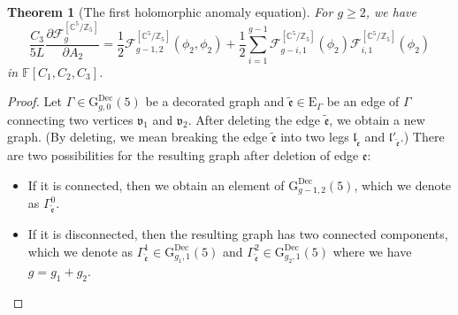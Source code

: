 \documentclass[10pt,a4paper]{amsart}
\newtheorem{thm}{Theorem}
\begin{document}
\begin{thm}[The first holomorphic anomaly equation]\label{thm:HAE_wrt_A2_partial}
For $g\geq{2}$, we have
\begin{equation*}
\frac{C_{3}}{5L}\frac{\partial\mathcal{F}_{g}^{\left[\mathbb{C}^{5} / \mathbb{Z}_{5}\right]}}{\partial A_2}
=\frac{1}{2}\mathcal{F}_{g-1,2}^{\left[\mathbb{C}^5 / \mathbb{Z}_5\right]}\left(\phi_2,\phi_2\right)+\frac{1}{2}\sum_{i=1}^{g-1}\mathcal{F}_{g-i,1}^{\left[\mathbb{C}^5 / \mathbb{Z}_5\right]}\left(\phi_2\right)\mathcal{F}_{i,1}^{\left[\mathbb{C}^5 / \mathbb{Z}_5\right]}\left(\phi_2\right)
\end{equation*}
in $\mathbb{F}[C_1,C_2,C_3]$.
\end{thm}

\begin{proof}
Let $\Gamma\in\mathrm{G}_{g,0}^{\text{Dec}}(5)$ be a decorated graph and $\tilde{\mathfrak{e}}\in\mathrm{E}_{\Gamma}$ be an edge of $\Gamma$ connecting two vertices $\mathfrak{v}_1$ and $\mathfrak{v}_2$. After deleting the edge $\tilde{\mathfrak{e}}$, we obtain a new graph. (By deleting, we mean breaking the edge $\tilde{\mathfrak{e}}$ into two legs $\mathfrak{l}_{\tilde{\mathfrak{e}}}$ and $\mathfrak{l}'_{\tilde{\mathfrak{e}}}$.) There are two possibilities for the resulting graph after deletion of edge $\mathfrak{e}$:
\begin{itemize}
    \item[(i)] If it is connected, then we obtain an element of $\mathrm{G}_{g-1,2}^{\text{Dec}}(5)$, which we denote as $\Gamma_{\tilde{\mathfrak{e}}}^0$.
    
    \item[(ii)] If it is disconnected, then the resulting graph has two connected components, which we  denote as $\Gamma_{\tilde{\mathfrak{e}}}^1\in\mathrm{G}_{g_1,1}^{\text{Dec}}(5)$ and $\Gamma_{\tilde{\mathfrak{e}}}^2\in\mathrm{G}_{g_2,1}^{\text{Dec}}(5)$ where we have $g=g_1+g_2$.
\end{itemize}


\end{proof}
\end{document}

